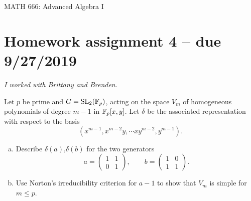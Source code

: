 \documentclass[leqno]{article}
\author{Colin Roberts}
\begin{document}
\begin{center}
  \begin{huge}
    MATH 666: Advanced Algebra I
  \end{huge}
\end{center}

\section*{Homework assignment 4 -- due 9/27/2019}
\noindent \emph{I worked with Brittany and Brenden.}
\setcounter{problem}{15}
\begin{problem}
Let $p$ be prime and $G=\mathrm{SL}_2(\mathbb{F}_p)$, acting on the space $V_m$ of
homogeneous polynomials of degree $m-1$ in $\mathbb{F}_p[x,y]$. Let $\delta$ be the
associated representation with respect to the basis
\[
(x^{m-1},x^{m-2}y,\cdots xy^{m-2},y^{m-1}).
\]
\begin{enumerate}[(a)]
    \item Describe $\delta(a)$,$\delta(b)$ for the two generators
\[
a=
\left(\begin{array}{cc}
1&1\\0&1
\end{array}
\right),\qquad
b=
\left(\begin{array}{cc}
1&0\\1&1
\end{array}
\right).
\]
\item Use {\sc Norton}'s irreducibility criterion for $a-1$ to show that $V_m$
is simple for $m\le p$.
\end{enumerate}
\end{problem}
\end{document}
